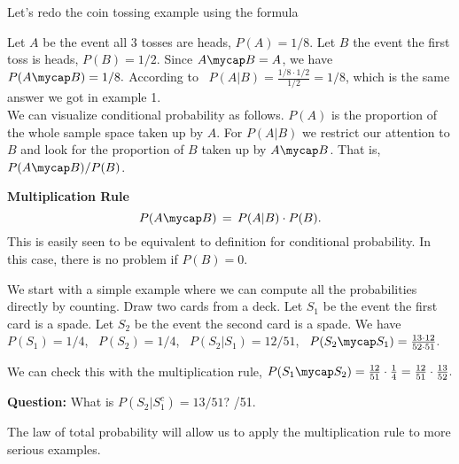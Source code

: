  Let's redo the coin tossing example using 
the formula 
\parbox{4.5in}{
Let  $A$ be the event all 3 tosses are heads, $P(A) = 1/8.$
Let $B$ the event the first toss is heads, $P(B) = 1/2.$
Since $A\mycap B = A$, we have  $P(A\mycap B) = 1/8.$
According to  \,
 $P(A|B) = \frac{1/8\cdot 1/2}{1/2} = 1/8$, which is the same answer
we got in example 1.\\[2ex]
%
We can visualize conditional probability as follows.
$P(A)$ is the proportion of the whole sample space taken
up by $A$. For $P(A|B)$ we restrict our attention to $B$
and look for the proportion of $B$ taken up by $A\mycap B$.
That is, $P(A\mycap B)/P(B)$.
}
\parbox{2in}{
\def\sc{3cm}
}

\cont

\textbf{Multiplication Rule}
\begin{equation}\label{multrule}
P(A\mycap B) \, = \, P(A|B)\cdot P(B).
\end{equation}
This is easily seen to be equivalent to  definition  for conditional probability.
In this case, there is no problem if $P(B) = 0$.

We start with a simple example where we can compute all the probabilities
directly by counting.
 Draw two cards from a deck.
Let $S_1$  be the event the first card is a spade.
Let $S_2$  be the event the second card is a spade.
We have \,
$P(S_1) = 1/4$, \, $P(S_2) = 1/4$, \,
$P(S_2|S_1) = 12/51$, \,
$P(S_2\mycap S_1) = \frac{13\cdot 12}{52\cdot 51}.$

We can check this with the multiplication rule,  
$P(S_1\mycap S_2) = \frac{12}{51}\cdot\frac{1}{4}
= \frac{12}{51}\cdot\frac{13}{52}.$

\medskip

\textbf{Question:} What is $P(S_2|S_1^c) = 13/51$? \quad
{}/51.

\medskip

The law of total probability will allow us to apply the multiplication
rule to more serious examples.

